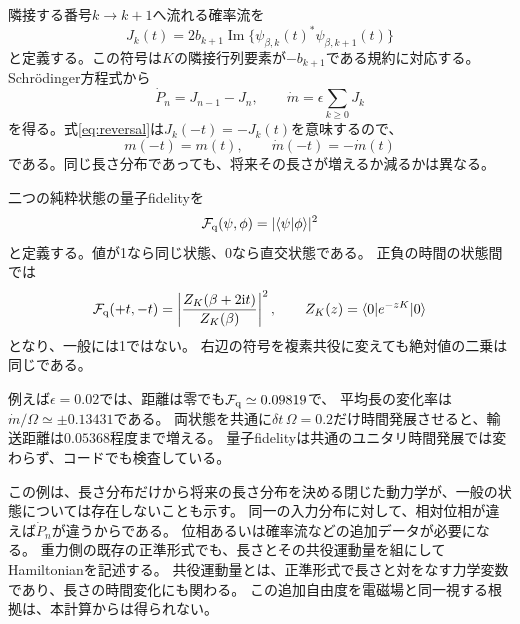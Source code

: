 \documentclass[a4paper,11pt]{ltjsarticle}
\numberwithin{equation}{section}
\newcommand{\ket}[1]{\lvert #1\rangle}
\newcommand{\bra}[1]{\langle #1\rvert}
\newcommand{\ii}{\mathrm i}
\begin{document}
隣接する番号$k\to k+1$へ流れる確率流を
\begin{equation}
 J_k(t)=2b_{k+1}\operatorname{Im}\{
 \psi_{\beta,k}(t)^*\psi_{\beta,k+1}(t)\}
 \label{eq:current}
\end{equation}
と定義する。この符号は$K$の隣接行列要素が$-b_{k+1}$である規約に対応する。
Schr\"odinger方程式から
\begin{equation}
 \dot P_n=J_{n-1}-J_n,\qquad
 \dot m=\epsilon\sum_{k\geq0}J_k
 \label{eq:continuity}
\end{equation}
を得る。式\eqref{eq:reversal}は$J_k(-t)=-J_k(t)$を意味するので、
\begin{equation}
 m(-t)=m(t),\qquad \dot m(-t)=-\dot m(t)
 \label{eq:velocities}
\end{equation}
である。同じ長さ分布であっても、将来その長さが増えるか減るかは異なる。

二つの純粋状態の量子fidelityを
\begin{equation}
 \mathcal F_{\rm q}(\psi,\phi)=|\langle\psi|\phi\rangle|^2
 \label{eq:fidelity}
\end{equation}
と定義する。値が1なら同じ状態、0なら直交状態である。
正負の時間の状態間では
\begin{equation}
 \mathcal F_{\rm q}(+t,-t)
 =\left|\frac{Z_K(\beta+2\ii t)}{Z_K(\beta)}\right|^2,
 \qquad Z_K(z)=\bra0 e^{-zK}\ket0
 \label{eq:fidelitypartition}
\end{equation}
となり、一般には1ではない。
右辺の符号を複素共役に変えても絶対値の二乗は同じである。

\begin{table}[htbp]
 \centering\small
 
 \caption{$\beta\Omega=10$、$t\Omega=1$での正負時間状態の比較。
 その後、両状態を同じ正の時間$\delta t\,\Omega=0.2$だけ発展させる。
 初期の零は解析的に厳密であり、計算でも同じ確率を与える。
 $\dot m(-t)$は表の変化率の負値である。}
 \label{tab:reverse}
\end{table}

例えば$\epsilon=0.02$では、距離は零でも$\mathcal F_{\rm q}\simeq0.09819$で、
平均長の変化率は$\dot m/\Omega\simeq\pm0.13431$である。
両状態を共通に$\delta t\,\Omega=0.2$だけ時間発展させると、輸送距離は$0.05368$程度まで増える。
量子fidelityは共通のユニタリ時間発展では変わらず、コードでも検査している。

この例は、長さ分布だけから将来の長さ分布を決める閉じた動力学が、一般の状態については存在しないことも示す。
同一の入力分布に対して、相対位相が違えば$\dot P_n$が違うからである。
位相あるいは確率流などの追加データが必要になる。
重力側の既存の正準形式でも、長さとその共役運動量を組にしてHamiltonianを記述する\cite{Heller}。
共役運動量とは、正準形式で長さと対をなす力学変数であり、長さの時間変化にも関わる。
この追加自由度を電磁場と同一視する根拠は、本計算からは得られない。
\end{document}
